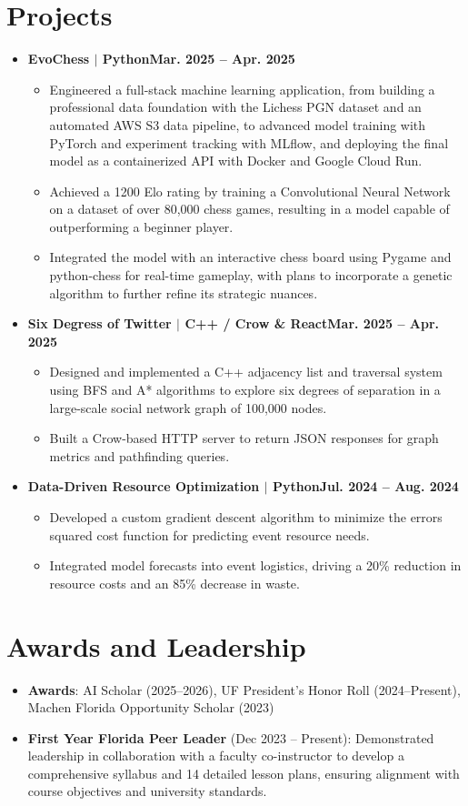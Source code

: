 \documentclass[letterpaper,9.7pt]{article}
\newcommand{\resumeSubHeadingListStart}{\begin{itemize}[leftmargin=0pt,label={},itemsep=2pt]}
\newcommand{\resumeSubHeadingListEnd}{\end{itemize}}
\newcommand{\resumeItemListStart}{\begin{itemize}[label=\textbullet,leftmargin=0.2in,itemsep=1pt]}
\newcommand{\resumeItemListEnd}{\end{itemize}}
\newcommand{\resumeItem}[1]{\item #1}
\begin{document}
\section{\textbf{Projects}}
\resumeSubHeadingListStart
  \item{\textbf{EvoChess $|$ Python}}\hfill\textbf{Mar. 2025 -- Apr. 2025}
  \resumeItemListStart
    \resumeItem{Engineered a full-stack machine learning application, from building a professional data foundation with the Lichess PGN dataset and an automated AWS S3 data pipeline, to advanced model training with PyTorch and experiment tracking with MLflow, and deploying the final model as a containerized API with Docker and Google Cloud Run.}
    \resumeItem{Achieved a 1200 Elo rating by training a Convolutional Neural Network on a dataset of over 80,000 chess games, resulting in a model capable of outperforming a beginner player.}
    \resumeItem{Integrated the model with an interactive chess board using Pygame and python-chess for real-time gameplay, with plans to incorporate a genetic algorithm to further refine its strategic nuances.}
  \resumeItemListEnd

  \item{\textbf{Six Degress of Twitter $|$ C++ / Crow \& React}}\hfill\textbf{Mar. 2025 -- Apr. 2025}
  \resumeItemListStart
    \resumeItem{Designed and implemented a C++ adjacency list and traversal system using BFS and A* algorithms to explore six degrees of separation in a large-scale social network graph of 100,000 nodes.}
    \resumeItem{Built a Crow-based HTTP server to return JSON responses for graph metrics and pathfinding queries.}
  \resumeItemListEnd

  \item{\textbf{Data-Driven Resource Optimization $|$ Python}}\hfill\textbf{Jul. 2024 -- Aug. 2024}
  \resumeItemListStart
    \resumeItem{Developed a custom gradient descent algorithm to minimize the errors squared cost function for predicting event resource needs.}
    \resumeItem{Integrated model forecasts into event logistics, driving a 20\% reduction in resource costs and an 85\% decrease in waste.}
  \resumeItemListEnd
\resumeSubHeadingListEnd

\section{\textbf{Awards and Leadership}}
\resumeSubHeadingListStart
  \item{\textbf{Awards}: AI Scholar (2025–2026), UF President’s Honor Roll (2024–Present), Machen Florida Opportunity Scholar (2023)}
  \item{\textbf{First Year Florida Peer Leader} (Dec 2023 – Present): Demonstrated leadership in collaboration with a faculty co-instructor to develop a comprehensive syllabus and 14 detailed lesson plans, ensuring alignment with course objectives and university standards.}
\resumeSubHeadingListEnd
\end{document}
